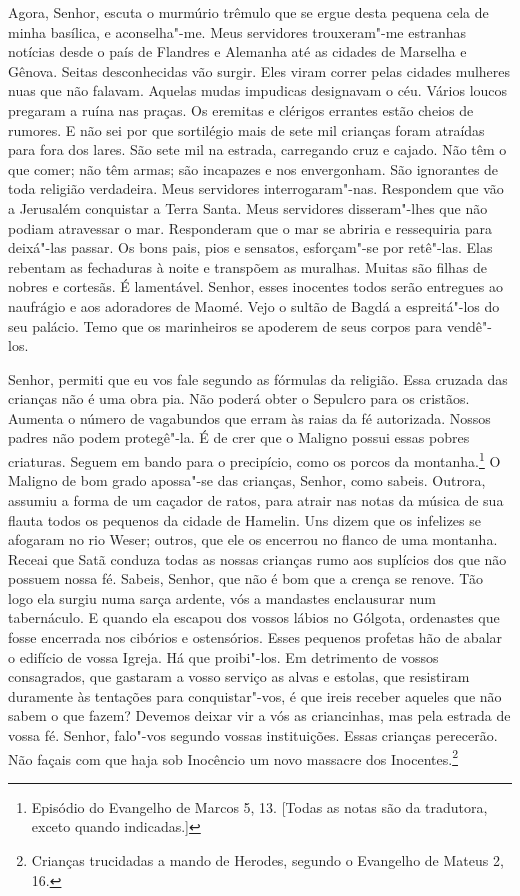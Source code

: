 Agora, Senhor, escuta o murmúrio trêmulo que se ergue desta pequena cela de
minha basílica, e aconselha"-me. Meus servidores trouxeram"-me estranhas
notícias desde o país de Flandres e Alemanha até as cidades de Marselha e
Gênova. Seitas desconhecidas vão surgir. Eles viram correr pelas cidades
mulheres nuas que não falavam. Aquelas mudas impudicas designavam o céu.
Vários loucos pregaram a ruína nas praças. Os eremitas e clérigos errantes
estão cheios de rumores. E não sei por que sortilégio mais de sete mil
crianças foram atraídas para fora dos lares. São sete mil na estrada,
carregando cruz e cajado. Não têm o que comer; não têm armas; são
incapazes e nos envergonham. São ignorantes de toda religião verdadeira.
Meus servidores interrogaram"-nas. Respondem que vão a Jerusalém conquistar
a Terra Santa. Meus servidores disseram"-lhes que não podiam atravessar o
mar. Responderam que o mar se abriria e ressequiria para deixá"-las passar.
Os bons pais, pios e sensatos, esforçam"-se por retê"-las. Elas rebentam as
fechaduras à noite e transpõem as muralhas. Muitas são filhas de nobres e
cortesãs. É lamentável. Senhor, esses inocentes todos serão entregues ao
naufrágio e aos adoradores de Maomé. Vejo o sultão de Bagdá a espreitá"-los
do seu palácio. Temo que os marinheiros se apoderem de seus corpos para
vendê"-los.

Senhor, permiti que eu vos fale segundo as fórmulas da religião. Essa
cruzada das crianças não é uma obra pia. Não poderá obter o Sepulcro para
os cristãos. Aumenta o número de vagabundos que erram às raias da fé
autorizada. Nossos padres não podem protegê"-la. É de crer que o Maligno
possui essas pobres criaturas. Seguem em bando para o precipício, como os
porcos da montanha.\footnote{ Episódio do Evangelho de Marcos 5, 13. 
[Todas as notas são da tradutora, exceto quando indicadas.]} O
Maligno de bom grado apossa"-se das crianças, Senhor, como sabeis. Outrora,
assumiu a forma de um caçador de ratos, para atrair nas notas da música de
sua flauta todos os pequenos da cidade de Hamelin. Uns dizem que os
infelizes se afogaram no rio Weser; outros, que ele os encerrou no flanco
de uma montanha. Receai que Satã conduza todas as nossas crianças rumo aos
suplícios dos que não possuem nossa fé. Sabeis, Senhor, que não é bom que
a crença se renove. Tão logo ela surgiu numa sarça ardente, vós a
mandastes enclausurar num tabernáculo. E quando ela escapou dos vossos
lábios no Gólgota, ordenastes que fosse encerrada nos cibórios e
ostensórios. Esses pequenos profetas hão de abalar o edifício de vossa
Igreja. Há que proibi"-los. Em detrimento de vossos consagrados, que
gastaram a vosso serviço as alvas e estolas, que resistiram duramente às
tentações para conquistar"-vos, é que ireis receber aqueles que não sabem o
que fazem? Devemos deixar vir a vós as criancinhas, mas pela estrada de
vossa fé. Senhor, falo"-vos segundo vossas instituições. Essas crianças
perecerão. Não façais com que haja sob Inocêncio um novo massacre dos
Inocentes.\footnote{ Crianças trucidadas a mando de Herodes, segundo o
Evangelho de Mateus 2, 16.}

